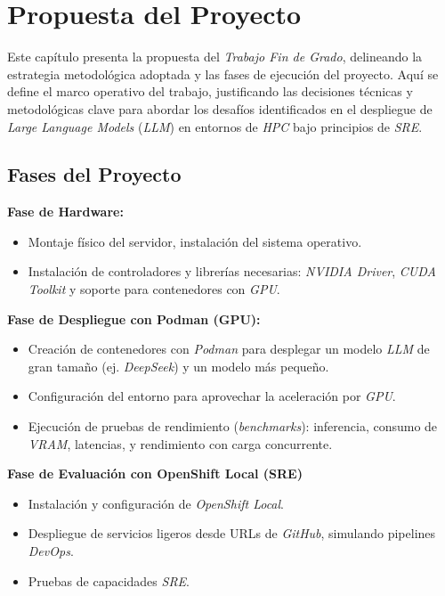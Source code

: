 \chapter{Propuesta del Proyecto}

Este capítulo presenta la propuesta del \textit{Trabajo Fin de Grado}, delineando la estrategia metodológica adoptada y las fases de ejecución del proyecto. Aquí se define el marco operativo del trabajo, justificando las decisiones técnicas y metodológicas clave para abordar los desafíos identificados en el despliegue de \textit{Large Language Models} (\textit{LLM}) en entornos de \textit{HPC} bajo principios de \textit{SRE}.

\section{Fases del Proyecto}
\noindent\textbf{Fase de Hardware:}
\begin{itemize}
    \item Montaje físico del servidor, instalación del sistema operativo.
    \item Instalación de controladores y librerías necesarias: \textit{NVIDIA Driver}, \textit{CUDA Toolkit} y soporte para contenedores con \textit{GPU}.
\end{itemize}
\textbf{Fase de Despliegue con Podman (GPU):}
\begin{itemize}
    \item Creación de contenedores con \textit{Podman} para desplegar un modelo \textit{LLM} de gran tamaño (ej. \textit{DeepSeek}) y un modelo más pequeño.
    \item Configuración del entorno para aprovechar la aceleración por \textit{GPU}.
    \item Ejecución de pruebas de rendimiento (\textit{benchmarks}): inferencia, consumo de \textit{VRAM}, latencias, y rendimiento con carga concurrente.
\end{itemize}
\newpage
\noindent\textbf{Fase de Evaluación con OpenShift Local (SRE)}
\begin{itemize}
    \item Instalación y configuración de \textit{OpenShift Local}.
    \item Despliegue de servicios ligeros desde URLs de \textit{GitHub}, simulando pipelines \textit{DevOps}.
    \item Pruebas de capacidades \textit{SRE}.
\end{itemize}


